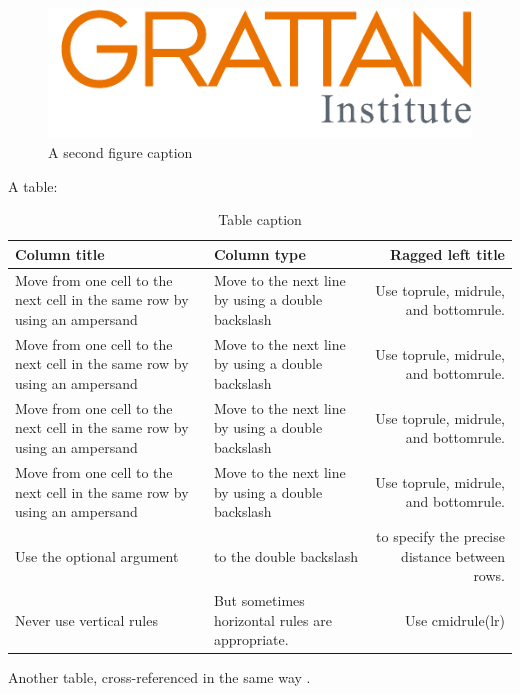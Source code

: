 \documentclass{grattan}
\begin{document}
\begin{figure}
\caption{A second figure caption\label{fig:2nd-example-figure}}
\includegraphics{logos/GrattanSVGLogo.pdf}
\end{figure}

A table:

\begin{table}
\caption{Table caption}\label{tbl:one-table}
\begin{tabularx}{\linewidth}{XXR}
%
\toprule
\textbf{Column title}                           & \textbf{Column type}                              & \textbf{Ragged left title} \\
\midrule
Move from one cell to the next cell in the same row by using an ampersand & Move to the next line by using a double backslash & Use toprule, midrule, and bottomrule. \\
Move from one cell to the next cell in the same row by using an ampersand & Move to the next line by using a double backslash & Use toprule, midrule, and bottomrule. \\
Move from one cell to the next cell in the same row by using an ampersand & Move to the next line by using a double backslash & Use toprule, midrule, and bottomrule. \\
Move from one cell to the next cell in the same row by using an ampersand & Move to the next line by using a double backslash & Use toprule, midrule, and bottomrule. \\[15.5pt]
Use the optional argument & to the double backslash & to specify the precise distance between rows. \\
\cmidrule(lr){2-3}
Never use vertical rules & But sometimes horizontal rules are appropriate. & Use cmidrule(lr) \\
\bottomrule
\end{tabularx}



\end{table}
Another table, cross-referenced in the same way .
\end{document}
